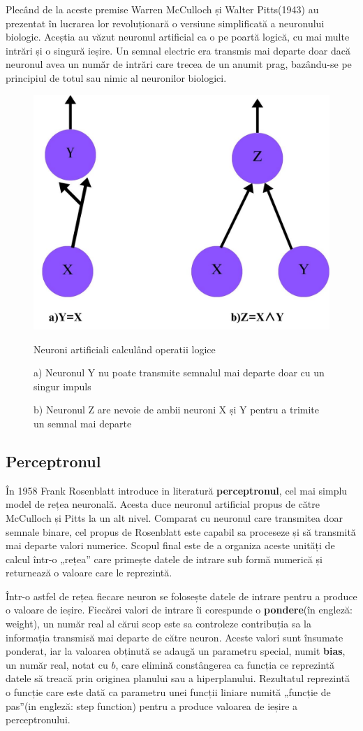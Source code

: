     Plecând de la aceste premise Warren McCulloch și Walter Pitts(1943) 
    \cite{mcculloch1943logical} au prezentat în lucrarea lor revoluționară o versiune simplificată a neuronului biologic. Aceștia au văzut neuronul artificial ca o pe poartă logică, cu mai multe intrări și o singură ieșire. Un semnal electric era transmis mai departe doar dacă neuronul avea un număr de intrări care trecea de un anumit prag, bazându-se pe principiul de totul sau nimic al neuronilor biologici.  

     \begin{figure}[h]
         \centering 
         \includegraphics[width=.5\textwidth]{images/artificial-neurons-as-logic-gates.jpg}
         \captionsetup{font=footnotesize}
         \caption{Neuroni artificiali calculând operatii logice}
         \caption*{a) Neuronul Y nu poate transmite semnalul mai departe              doar cu un singur impuls}
         \caption*{b) Neuronul Z are nevoie de ambii neuroni X și Y pentru a trimite un semnal mai departe}
    \end{figure}

    \newpage

\subsection{Perceptronul}
\label{ch: Perceptron}
În 1958 Frank Rosenblatt \cite{rosenblatt1958perceptron} introduce in literatură \textbf{perceptronul}, cel mai simplu model de rețea neuronală. Acesta duce neuronul artificial propus de către McCulloch și Pitts \cite{mcculloch1943logical} la un alt nivel. Comparat cu neuronul care transmitea doar semnale binare, cel propus de Rosenblatt este capabil sa proceseze și să transmită mai departe valori numerice. Scopul final este de a organiza aceste unități de calcul într-o „rețea” care primește datele de intrare sub formă numerică și returnează o valoare care le reprezintă. 

Într-o astfel de rețea fiecare neuron se folosește datele de intrare pentru a produce o valoare de ieșire. Fiecărei valori de intrare îi corespunde o \textbf{pondere}(în engleză: weight), un număr real al cărui scop este sa controleze contribuția sa la informația transmisă mai departe de către neuron. Aceste valori sunt însumate ponderat, iar la valoarea obținută se adaugă un parametru special, numit \textbf{bias}, un număr real, notat cu $b$, care elimină constângerea ca funcția ce reprezintă datele să treacă prin originea planului sau a hiperplanului. Rezultatul reprezintă o funcție care este dată ca parametru unei funcții liniare numită „funcție de pas”(in engleză: step function) pentru a produce valoarea de ieșire a perceptronului. 

